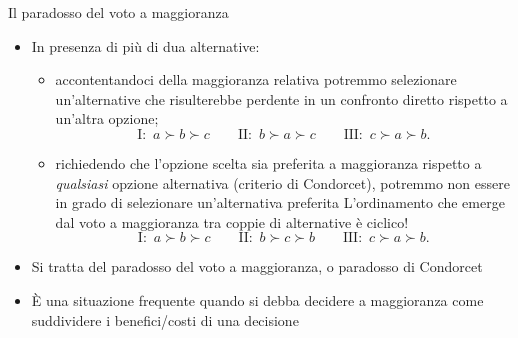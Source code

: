 \documentclass[aspectratio=64,11pt]{beamer}
\begin{document}
\begin{frame}{Il paradosso del voto a maggioranza}
\begin{itemize}
\item In presenza di più di dua alternative:
\begin{itemize}
\item accontentandoci della \alert{maggioranza relativa} potremmo selezionare
un'alternative che risulterebbe perdente in un confronto diretto rispetto
a un'altra opzione;
\begin{equation*}
\text{I:}\enspace a \succ b \succ c \qquad 
\text{II:}\enspace b \succ a \succ c \qquad 
\text{III:}\enspace c \succ a \succ b.
\end{equation*}
\item richiedendo che l'opzione scelta sia preferita a maggioranza rispetto a
\emph{qualsiasi} opzione alternativa (criterio di Condorcet), potremmo non
essere in grado di selezionare un'alternativa preferita
L'ordinamento che emerge dal voto a maggioranza tra coppie di alternative
è \alert{ciclico}!
\begin{equation*}
\text{I:}\enspace a \succ b \succ c \qquad 
\text{II:}\enspace b \succ c \succ b \qquad 
\text{III:}\enspace c \succ a \succ b.
\end{equation*}
\end{itemize}
\item Si tratta del \alert{paradosso del voto a maggioranza}, o \alert{paradosso di Condorcet}
\item È una situazione frequente quando si debba decidere a maggioranza
come suddividere i benefici/costi di una decisione
\end{itemize}
\end{frame}
\end{document}
